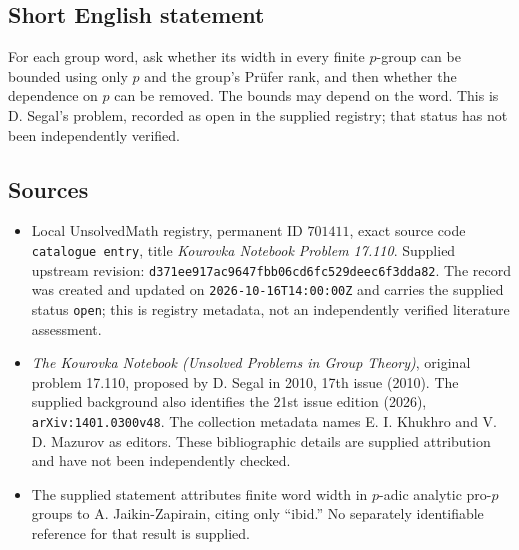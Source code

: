 \documentclass[11pt]{article}
\begin{document}
\subsection{Short English statement}
For each group word, ask whether its width in every finite \(p\)-group can be bounded using only \(p\) and the group's Pr\"ufer rank, and then whether the dependence on \(p\) can be removed. The bounds may depend on the word. This is D. Segal's problem, recorded as open in the supplied registry; that status has not been independently verified.
\subsection{Sources}
\begin{itemize}
\item Local UnsolvedMath registry, permanent ID \(701411\), exact source code \texttt{catalogue entry}, title \emph{Kourovka Notebook Problem 17.110}. Supplied upstream revision: \texttt{d371ee917ac9647fbb06cd6fc529deec6f3dda82}. The record was created and updated on \texttt{2026-10-16T14:00:00Z} and carries the supplied status \texttt{open}; this is registry metadata, not an independently verified literature assessment.
\item \emph{The Kourovka Notebook (Unsolved Problems in Group Theory)}, original problem 17.110, proposed by D. Segal in 2010, 17th issue (2010). The supplied background also identifies the 21st issue edition (2026), \texttt{arXiv:1401.0300v48}. The collection metadata names E. I. Khukhro and V. D. Mazurov as editors. These bibliographic details are supplied attribution and have not been independently checked.
\item The supplied statement attributes finite word width in \(p\)-adic analytic pro-\(p\) groups to A. Jaikin-Zapirain, citing only ``ibid.'' No separately identifiable reference for that result is supplied.
\end{itemize}
\end{document}
